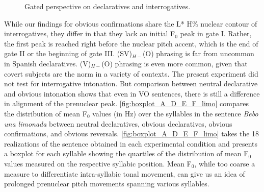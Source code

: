 \begin{figure}
	\caption[Gated perspective on declaratives and interrogatives]{Gated perspective on declaratives and interrogatives.}\label{fig:declarativeinterrogativeFACE}
\end{figure}

While our findings for obvious confirmations share the L* H\% nuclear contour of interrogatives, they differ in that they lack an initial F$_0$ peak in gate I. Rather, the first peak is reached right before the nuclear pitch accent, which is the end of gate II or the beginning of gate III. (SV)$_{H-}$(O) phrasing is far from uncommon in Spanish declaratives. (V)$_{H-}$(O) phrasing is even more common, given that covert subjects are the norm in a variety of contexts. The present experiment did not test for interrogative intonation. But comparison between neutral declarative and obvious intonation shows that even in VO sentences, there is still a difference in alignment of the prenuclear peak. \autoref{fig:boxplot_A_D_E_F_limo} compares the distribution of mean F$_0$ values (in Hz) over the syllables in the sentence \textit{Bebo una limonada} between neutral declaratives, obvious declaratives, obvious confirmations, and obvious reversals. \autoref{fig:boxplot_A_D_E_F_limo} takes the 18 realizations of the sentence obtained in each experimental condition and presents a boxplot for each syllable showing the quartiles of the distribution of mean F$_0$ values measured on the respective syllabic position. Mean F$_0$, while too coarse a measure to differentiate intra-syllabic tonal movement, can give us an idea of prolonged prenuclear pitch movements spanning various syllables.

